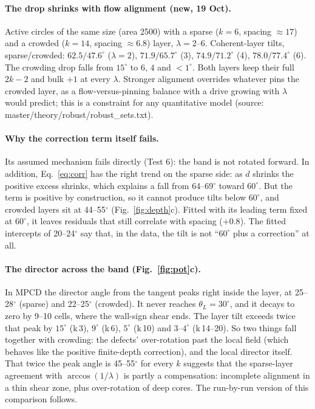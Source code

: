 \documentclass[11pt,a4paper]{article}
\begin{document}
\paragraph{The drop shrinks with flow alignment (new, 19 Oct).} Active circles of the same size (area 2500) with a sparse ($k=6$, spacing $\approx17$) and a
crowded ($k=14$, spacing $\approx6.8$) layer, $\lambda=2$--6. Coherent-layer tilts, sparse/crowded: $62.5/47.6^\circ$ ($\lambda=2$), $71.9/65.7^\circ$ (3),
$74.9/71.2^\circ$ (4), $78.0/77.4^\circ$ (6). The crowding drop falls from $15^\circ$ to $6$, $4$ and $<1^\circ$. Both layers keep their full $2k-2$ and bulk $+1$ at every $\lambda$.
Stronger alignment overrides whatever pins the crowded layer, as a flow-versus-pinning balance with a drive growing with $\lambda$ would predict; this is
a constraint for any quantitative model (source: master/theory/robust/robust\_sets.txt).

\paragraph{Why the correction term itself fails.} Its assumed mechanism fails directly (Test 6): the band is not rotated forward. In addition, Eq.~\eqref{eq:corr} has the right trend on the sparse side: as $d$ shrinks the positive excess shrinks, which explains a fall from 64--69$^\circ$ toward $60^\circ$. But the term is positive by construction, so it cannot produce tilts below $60^\circ$, and crowded layers sit at 44--55$^\circ$ (Fig.~\ref{fig:depth}c). Fitted with its leading term fixed at $60^\circ$, it leaves residuals that still correlate with spacing ($+0.8$). The fitted intercepts of 20--24$^\circ$ say that, in the data, the tilt is not ``$60^\circ$ plus a correction'' at all.

\paragraph{The director across the band (Fig.~\ref{fig:pot}c).} In MPCD the director angle from the tangent peaks right inside the layer, at 25--28$^\circ$ (sparse) and 22--25$^\circ$ (crowded). It never reaches $\theta_L=30^\circ$, and it decays to zero by 9--10 cells, where the wall-sign shear ends. The layer tilt exceeds twice that peak by $15^\circ$ (k\,3), $9^\circ$ (k\,6), $5^\circ$ (k\,10) and $3$--$4^\circ$ (k\,14--20). So two things fall together with crowding: the defects' over-rotation past the local field (which behaves like the positive finite-depth correction), and the local director itself. That twice the peak angle is 45--55$^\circ$ for every $k$ suggests that the sparse-layer agreement with $\arccos(1/\lambda)$ is partly a compensation: incomplete alignment in a thin shear zone, plus over-rotation of deep cores. The run-by-run version of this comparison follows.
\end{document}

